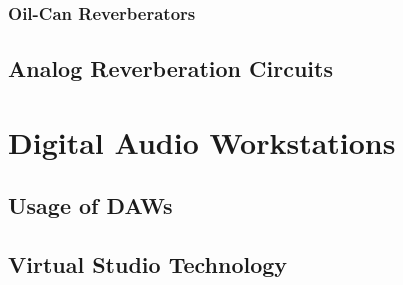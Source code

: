 \subsubsection{Oil-Can Reverberators}
\subsection{Analog Reverberation Circuits}
\section{Digital Audio Workstations}
\subsection{Usage of DAWs}
\subsection{Virtual Studio Technology}
